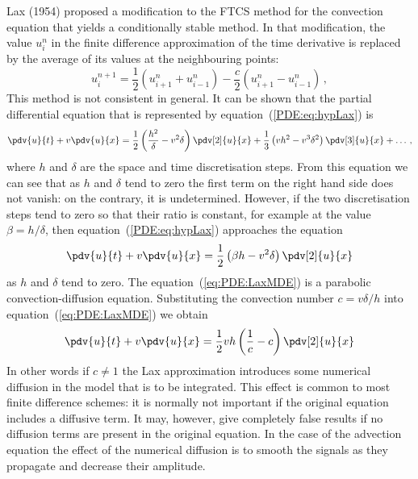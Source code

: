 Lax (1954) proposed a modification to the FTCS method for the
convection equation that yields a conditionally stable method.  In
that modification, the value $u_{i}^{n}$ in the finite difference
approximation of the time derivative is replaced by the average of its
values at the neighbouring points:
%
\begin{equation}
  u_{i}^{n+1} = \frac{1}{2} (u_{i+1}^{n} + u_{i-1}^{n}) -
  \frac{c}{2} (u_{i+1}^{n}-u_{i-1}^{n}) \, ,
  \label{PDE:eq:hypLax}
\end{equation}
%
This method is not consistent in general.  It can be shown that the
partial differential equation that is represented by
equation~(\ref{PDE:eq:hypLax}) is
%
\begin{equation}
  \pdv{u}{t} + v \pdv{u}{x} = \frac{1}{2}
  \left ( \frac{h^2}{\delta} - v^2 \delta \right )
  \pdv[2]{u}{x} +
  \frac{1}{3} \left ( v h^2 - v^3 \delta^2 \right ) \pdv[3]{u}{x} +
  \ldots \, ,
  \label{PDE:eq:LaxEquiv}
\end{equation}
%
where $h$ and $\delta$ are the space and time discretisation steps.
From this equation we can see that as $h$ and $\delta$ tend to zero
the first term on the right hand side does not vanish: on the
contrary, it is undetermined.  However, if the two discretisation
steps tend to zero so that their ratio is constant, for example at the
value $\beta = h / \delta$, then equation~(\ref{PDE:eq:hypLax})
approaches the equation
%
\begin{equation}
  \pdv{u}{t} + v \pdv{u}{x} = \frac{1}{2}
  \left ( \beta h - v^2 \delta \right )
  \pdv[2]{u}{x}
  \label{eq:PDE:LaxMDE}
\end{equation}
%
as $h$ and $\delta$ tend to zero.  The equation~(\ref{eq:PDE:LaxMDE})
is a parabolic convection-diffusion equation.  Substituting the
convection number $c=v \delta/h$ into equation~(\ref{eq:PDE:LaxMDE})
we obtain
%
\begin{equation}
  \pdv{u}{t} + v \pdv{u}{x} = \frac{1}{2} v h
  \left ( \frac{1}{c} - c \right ) \pdv[2]{u}{x}
  \label{eq:PDE:LaxMDE1}
\end{equation}
%
In other words if $c \neq 1$ the Lax approximation introduces some
numerical diffusion in the model that is to be integrated.  This
effect is common to most finite difference schemes: it is normally not
important if the original equation includes a diffusive term.  It may,
however, give completely false results if no diffusion terms are
present in the original equation.  In the case of the advection
equation the effect of the numerical diffusion is to smooth the
signals as they propagate and decrease their amplitude.


